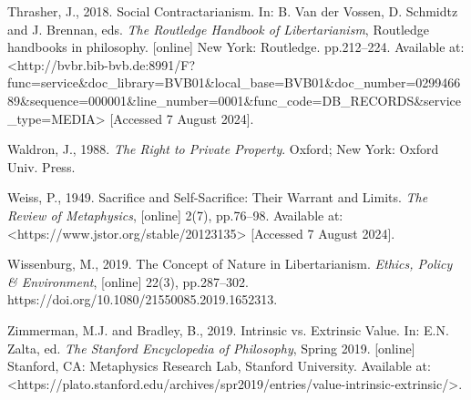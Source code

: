 Thrasher, J., 2018. Social Contractarianism. In: B. Van der Vossen, D. Schmidtz and J. Brennan, eds. \textit{The Routledge Handbook of Libertarianism}, Routledge handbooks in philosophy. [online] New York: Routledge. pp.212–224. Available at: {\textless}http://bvbr.bib-bvb.de:8991/F?func=service\&doc\_library=BVB01\&local\_base=BVB01\&doc\_number=029946689\&sequence=000001\&line\_number=0001\&func\_code=DB\_RECORDS\&service\_type=MEDIA{\textgreater} [Accessed 7 August 2024].



Waldron, J., 1988. \textit{The Right to Private Property}. Oxford; New York: Oxford Univ. Press.



Weiss, P., 1949. Sacrifice and Self-Sacrifice: Their Warrant and Limits. \textit{The Review of Metaphysics}, [online] 2(7), pp.76–98. Available at: {\textless}https://www.jstor.org/stable/20123135{\textgreater} [Accessed 7 August 2024].



Wissenburg, M., 2019. The Concept of Nature in Libertarianism. \textit{Ethics, Policy \& Environment}, [online] 22(3), pp.287–302. https://doi.org/10.1080/21550085.2019.1652313.



Zimmerman, M.J. and Bradley, B., 2019. Intrinsic vs. Extrinsic Value. In: E.N. Zalta, ed. \textit{The Stanford Encyclopedia of Philosophy}, Spring 2019. [online] Stanford, CA: Metaphysics Research Lab, Stanford University. Available at: {\textless}https://plato.stanford.edu/archives/spr2019/entries/value-intrinsic-extrinsic/{\textgreater}.



